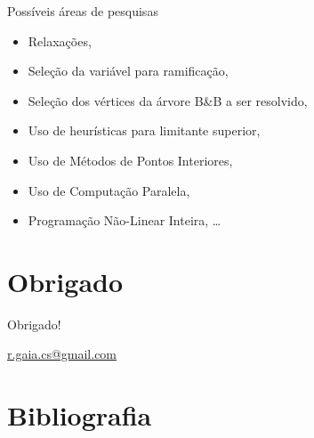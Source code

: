 \documentclass[11pt]{beamer}
\begin{document}
\begin{frame}{Possíveis áreas de pesquisas}
  \begin{itemize}
    \item Relaxações,
    \item Seleção da variável para ramificação,
    \item Seleção dos vértices da árvore B\&B a ser resolvido,
    \item Uso de heurísticas para limitante superior,
    \item Uso de Métodos de Pontos Interiores,
    \item Uso de Computação Paralela,
    \item Programação Não-Linear Inteira, \ldots
  \end{itemize}
\end{frame}
\section*{Obrigado}
\begin{frame}
  \begin{center}
    Obrigado!
  \end{center}
  \begin{center}
    \url{r.gaia.cs@gmail.com}
  \end{center}
\end{frame}

\section*{Bibliografia}
\begin{frame}
  \nocite{wolsey1998integer}
  
  
\end{frame}
\end{document}
